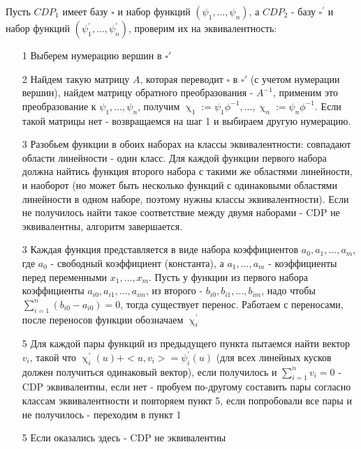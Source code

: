 \documentclass[16pt]{article}
\theoremstyle{definition}
\begin{document}
Пусть $CDP_1$ имеет базу $\square$ и набор функций $(\psi_1, \dots, \psi_n)$, а $CDP_2$ - базу $\square^{'}$ и набор функций $(\psi^{'}_1, \dots, \psi^{'}_n)$, проверим их на эквивалентность:
\begin{itemize}
\item[1] Выберем нумерацию вершин в $\square'$
\item[2] Найдем такую матрицу $A$, которая переводит $\square$ в $\square'$ (с учетом нумерации вершин), найдем матрицу обратного преобразования - $A^{-1}$, применим это преобразование к $\psi_1, ..., \psi_n$, получим $\upchi_1 := \psi_1\phi^{-1}, ..., \upchi_n := \psi_n\phi^{-1}$. Если такой матрицы нет - возвращаемся на шаг 1 и выбираем другую нумерацию. 
\item[3] Разобьем функции в обоих наборах на классы эквивалентности: совпадают области линейности - один класс. Для каждой функции первого набора должна найтись функция второго набора с такими же областями линейности, и наоборот (но может быть несколько функций с одинаковыми областями линейности в одном наборе, поэтому нужны классы эквивалентности). Если не получилось найти такое соответствие между двумя наборами - CDP не эквивалентны, алгоритм завершается.
\item[3] Каждая функция представляется в виде набора коэффициентов $a_0, a_1, \dots, a_m$, где $a_0$ - свободный коэффициент (константа), а $a_1, \dots, a_m$ - коэффициенты перед переменными $x_1, \dots, x_m$. Пусть у функции из первого набора коэффициенты $a_{i0}, a_{i1}, \dots, a_{im}$, из второго - $b_{i0}, b_{i1}, \dots, b_{im}$, надо чтобы $\sum_{i=1}^{n}(b_{i0} - a_{i0}) = 0$, тогда существует перенос. 
Работаем с переносами, после переносов функции обозначаем $\upchi^{'}_i$
\item[5] Для каждой пары функций из предыдущего пункта пытаемся найти вектор $v_i$, такой что $\upchi^{'}_i(u) + <u, v_i> = \psi^{'}_i(u)$ (для всех линейных кусков должен получиться одинаковый вектор), если получилось и $\sum_{i=1}^n v_i = 0$ - CDP эквивалентны, если нет - пробуем по-другому составить пары согласно классам эквивалентности и повторяем пункт 5, если попробовали все пары и не получилось - переходим в пункт 1
\item[5] Если оказались здесь - CDP не эквивалентны

\end{itemize}
\end{document}
